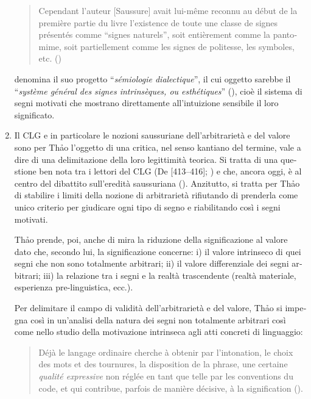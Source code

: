\documentclass[output=paper]{../langscibook}
\begin{document}
\begin{otherlanguage}{italian}
\begin{enumerate}
\begin{quote}
Cependant l’auteur [Saussure] avait lui-même reconnu au début de la première partie du livre l’existence de toute une classe de signes présentés comme “signes naturels”, soit entièrement comme la pantomime, soit partiellement comme les signes de politesse, les symboles, etc. (\citealt[39]{thao_phenomenologie_1974})
\end{quote}

\citet[42]{thao_phenomenologie_1974} denomina il suo progetto “\textit{sémiologie dialectique}”, il cui oggetto sarebbe il “\textit{système général des signes intrinsèques, ou esthétiques}” (\citealt[40]{thao_phenomenologie_1974}), cioè il sistema di segni motivati che mostrano direttamente all’intuizione sensibile il loro significato.

\item Il CLG e in particolare le nozioni saussuriane dell’arbitrarietà e del valore sono per Th\textlatin{ả}o l’oggetto di una critica, nel senso kantiano del termine, vale a dire di una delimitazione della loro legittimità teorica. Si tratta di una questione ben nota tra i lettori del CLG (De \citealt{de_mauro_note_2011}[413--416]; \citealt{sofia_petite_2013}) e che, ancora oggi, è al centro del dibattito sull’eredità saussuriana (\citealt{rastier_valeur_2002,paolucci_identite_2012,laks_phonotactique_2012,coursil_valeurs_2015}). Anzitutto, si tratta per Th\textlatin{ả}o di stabilire i limiti della nozione di arbitrarietà rifiutando di prenderla come unico criterio per giudicare ogni tipo di segno e riabilitando così i segni motivati.

Th\textlatin{ả}o prende, poi, anche di mira la riduzione della significazione al valore dato che, secondo lui, la significazione concerne: i) il valore intrinseco di quei segni che non sono totalmente arbitrari; ii) il valore differenziale dei segni arbitrari; iii) la relazione tra i segni e la realtà trascendente (realtà materiale, esperienza pre-linguistica, ecc.).

Per delimitare il campo di validità dell’arbitrarietà e del valore, Th\textlatin{ả}o si impegna così in un’analisi della natura dei segni non totalmente arbitrari così come nello studio della motivazione intrinseca agli atti concreti di linguaggio:

\begin{quote}
    Déjà le langage ordinaire cherche à obtenir par l’intonation, le choix des mots et des tournures, la disposition de la phrase, une certaine \textit{qualité expressive} non réglée en tant que telle par les conventions du code, et qui contribue, parfois de manière décisive, à la signification (\citealt[39--40]{thao_phenomenologie_1974}).
\end{quote}


\end{enumerate}
\end{otherlanguage}
\end{document}
